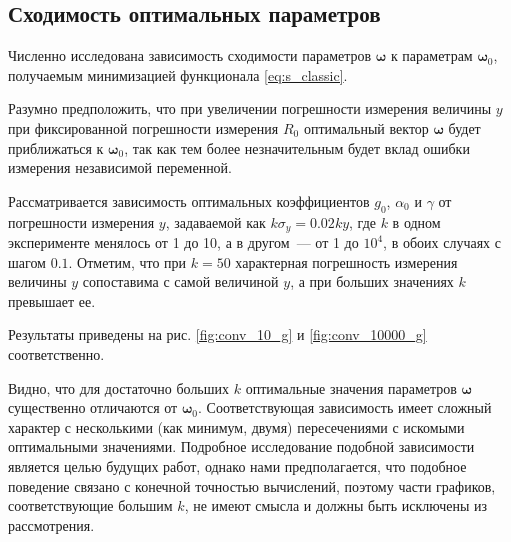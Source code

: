 \documentclass[11pt,a4paper]{article}
\begin{document}
\subsection{Сходимость оптимальных параметров}
Численно исследована зависимость сходимости параметров $\boldsymbol{\omega}$ к параметрам
$\boldsymbol{\omega}_0$, получаемым минимизацией функционала \eqref{eq:s_classic}.

Разумно предположить, что при увеличении погрешности измерения величины $y$ при
фиксированной погрешности измерения $R_0$ оптимальный вектор $\boldsymbol{\omega}$
будет приближаться к $\boldsymbol{\omega}_0$, так как тем более незначительным
будет вклад ошибки измерения независимой переменной.

Рассматривается зависимость оптимальных коэффициентов $g_0$, $\alpha_0$ и $\gamma$ от
погрешности измерения $y$, задаваемой как $k \sigma_y = 0.02ky$, где $k$ в одном эксперименте
менялось от 1 до 10, а в другом~--- от 1 до $10^4$, в обоих случаях с шагом $0.1$.
Отметим, что при $k = 50$ характерная погрешность измерения величины $y$ сопоставима с самой
величиной $y$, а при больших значениях $k$ превышает ее.

Результаты приведены на рис. \ref{fig:conv_10_g} и \ref{fig:conv_10000_g} соответственно.

Видно, что для достаточно больших $k$ оптимальные значения параметров $\boldsymbol{\omega}$
существенно отличаются от $\boldsymbol{\omega}_0$. Соответствующая зависимость имеет сложный
характер с несколькими (как минимум, двумя) пересечениями с искомыми оптимальными значениями.
Подробное исследование подобной зависимости является целью будущих работ, однако нами
предполагается, что подобное поведение связано с конечной точностью вычислений, поэтому части
графиков, соответствующие большим $k$, не имеют смысла и должны быть исключены из рассмотрения.
\end{document}
